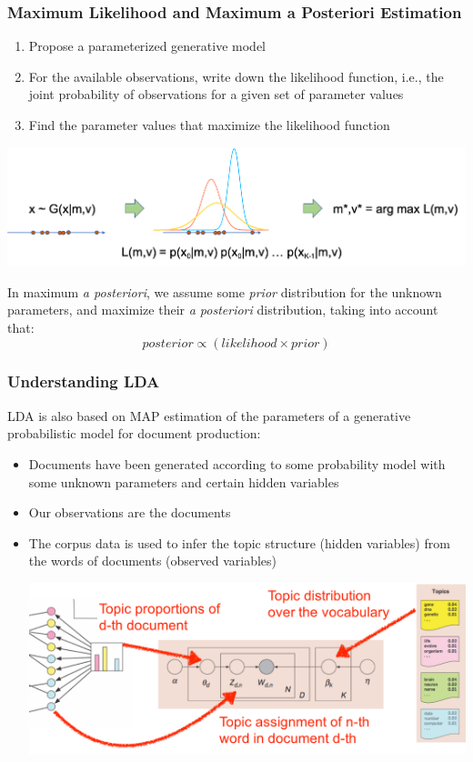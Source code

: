 \documentclass{beamer}
\begin{document}
\begin{frame}

    \frametitle{Maximum Likelihood and Maximum a Posteriori Estimation}
    
    \begin{enumerate}
        \item Propose a parameterized generative model
        \item For the available observations, write down the likelihood function, i.e., the joint probability of observations for a given set of parameter values
        \item Find the parameter values that maximize the likelihood function
        
    \end{enumerate}

	\centerline{\includegraphics[width=\textwidth]{./figs/ML_Gauss.png}}
	
	In maximum {\em a posteriori}, we assume some {\em prior} distribution for the unknown parameters, and maximize their {\em a posteriori} distribution, taking into account that:
	$$posterior \propto (likelihood \times prior)$$

\end{frame}



\begin{frame}


    \frametitle{Understanding LDA}

	LDA is also based on MAP estimation of the parameters of a generative probabilistic model for document production: 
	\begin{itemize}
	\item Documents have been generated according to some probability model with some unknown parameters and certain hidden variables
	\item Our observations are the documents
	\item The corpus data is used to infer the topic structure (hidden variables) from the words of documents (observed variables)
	\centerline{\includegraphics[width=.7\textwidth]{./figs/NLPTM_LDA2.png}}
	\end{itemize}

\end{frame}
\end{document}
